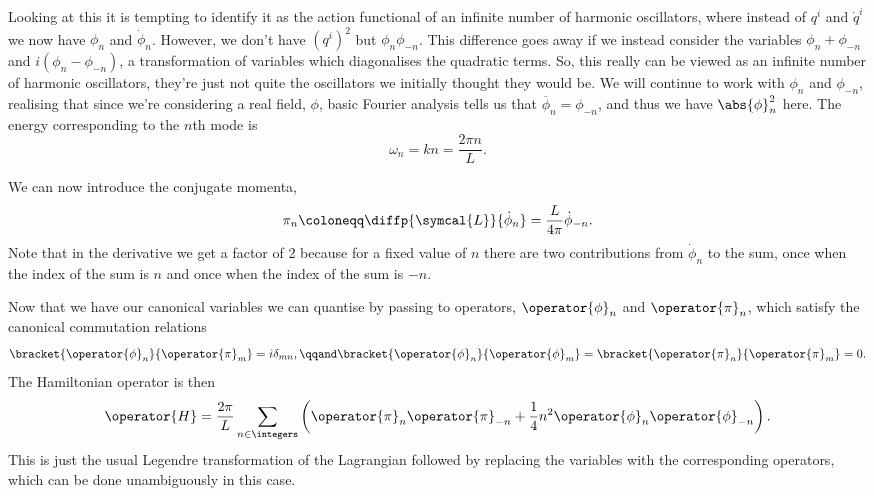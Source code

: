 \documentclass[fleqn]{NotesClass}
\newcommand{\lagrangian}{\symcal{L}}
\begin{document}
    Looking at this it is tempting to identify it as the action functional of an infinite number of harmonic oscillators, where instead of \(q^i\) and \(\dot{q}^i\) we now have \(\phi_n\) and \(\dot{\phi}_n\).
    However, we don't have \((q^i)^2\) but \(\phi_n \phi_{-n}\).
    This difference goes away if we instead consider the variables \(\phi_n + \phi_{-n}\) and \(i(\phi_n - \phi_{-n})\), a transformation of variables which diagonalises the quadratic terms.
    So, this really can be viewed as an infinite number of harmonic oscillators, they're just not quite the oscillators we initially thought they would be.
    We will continue to work with \(\phi_n\) and \(\phi_{-n}\), realising that since we're considering a real field, \(\phi\), basic Fourier analysis tells us that \(\overbar{\phi}_n = \phi_{-n}\), and thus we have \(\abs{\phi}_n^2\) here.
    The energy corresponding to the \(n\)th mode is
    \begin{equation}
        \omega_n = kn = \frac{2\pi n}{L}.
    \end{equation}
    
    We can now introduce the conjugate momenta,
    \begin{equation}
        \pi_n \coloneqq \diffp{\lagrangian}{\dot{\phi}_n} = \frac{L}{4\pi} \dot{\phi}_{-n}.
    \end{equation}
    Note that in the derivative we get a factor of 2 because for a fixed value of \(n\) there are two contributions from \(\dot{\phi}_n\) to the sum, once when the index of the sum is \(n\) and once when the index of the sum is \(-n\).
    
    Now that we have our canonical variables we can quantise by passing to operators, \(\operator{\phi}_n\) and \(\operator{\pi}_n\), which satisfy the canonical commutation relations
    \begin{equation}
        \bracket{\operator{\phi}_n}{\operator{\pi}_m} = i\delta_{mn}, \qqand \bracket{\operator{\phi}_n}{\operator{\phi}_m} = \bracket{\operator{\pi}_n}{\operator{\pi}_m} = 0.
    \end{equation}
    The Hamiltonian operator is then
    \begin{equation}
        \operator{H} = \frac{2\pi}{L} \sum_{n \in \integers} \left( \operator{\pi}_n \operator{\pi}_{-n} + \frac{1}{4}n^2\operator{\phi}_n\operator{\phi}_{-n} \right).
    \end{equation}
    This is just the usual Legendre transformation of the Lagrangian followed by replacing the variables with the corresponding operators, which can be done unambiguously in this case.
    
\end{document}
